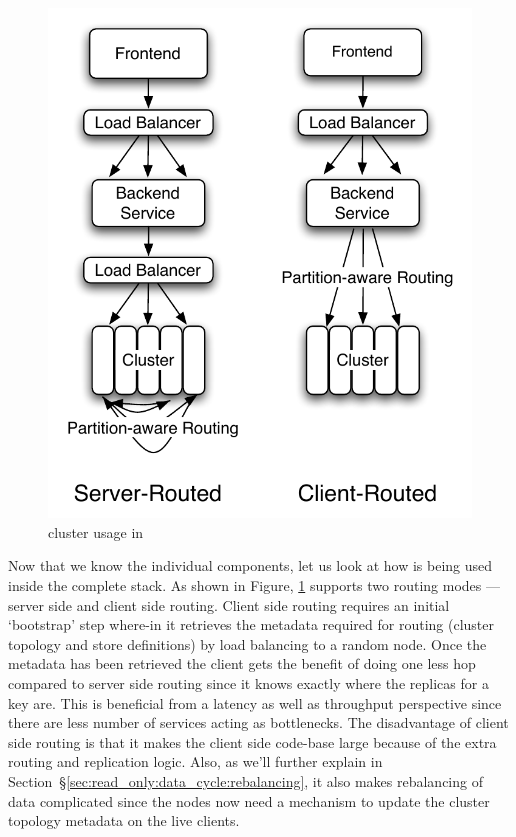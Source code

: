 \begin{figure}
  \centering
    \includegraphics[scale=0.45]{images/fullstack.pdf}
  \caption{\projectname{} cluster usage in \linkedin{}}
  \label{fullstack}
\end{figure}


\noindent 
Now that we know the individual components, let us look at how \projectname{} is being used inside the complete \linkedin{} stack. As shown in Figure, \ref{fullstack} \projectname{} supports two routing modes --- server side and client side routing. Client side routing requires an initial `bootstrap' step where-in it retrieves the metadata required for routing (cluster topology and store definitions) by load balancing to a random node. Once the metadata has been retrieved the client gets the benefit of doing one less hop compared to server side routing since it knows exactly where the replicas for a key are. This is beneficial from a latency as well as throughput perspective since there are less number of services acting as bottlenecks. The disadvantage of client side routing is that it makes the client side code-base large because of the extra routing and replication logic. Also, as we'll further explain in Section~\S\ref{sec:read_only:data_cycle:rebalancing}, it also makes rebalancing of data complicated since the \projectname{} nodes now need a mechanism to update the cluster topology metadata on the live clients. 



